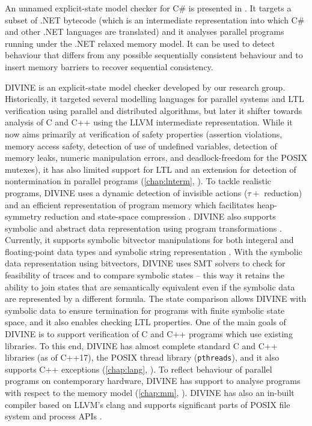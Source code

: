 An unnamed explicit-state model checker for C\# is presented in .
It targets a subset of .NET bytecode (which is an intermediate representation into which C\# and other .NET languages are translated) and it analyses parallel programs running under the .NET relaxed memory model.
It can be used to detect behaviour that differs from any possible sequentially consistent behaviour and to insert memory barriers to recover sequential consistency.

DIVINE  is an explicit-state model checker developed
by our research group.
Historically, it targeted several modelling languages for parallel systems and
LTL verification using parallel and distributed algorithms, but later it
shifter towards analysis of C and C++ using the LLVM intermediate representation.
While it now aims primarily at verification of safety properties (assertion
violations, memory access safety, detection of use of undefined variables,
detection of memory leaks, numeric manipulation errors, and deadlock-freedom for
the POSIX mutexes), it has also limited support for LTL and an
extension for detection of nontermination in parallel programs
(\autoref{chap:lnterm}, ).
To tackle realistic programs, DIVINE uses a dynamic detection of invisible
actions ($\tau+$ reduction) and an efficient representation of program memory
which facilitates heap-symmetry reduction and state-space
compression .
DIVINE also supports symbolic and abstract data representation using program
transformations .
Currently, it supports symbolic bitvector manipulations for both integeral and floating-point data types and symbolic string representation .
With the symbolic data representation using bitvectors, DIVINE uses SMT solvers
to check for feasibility of traces and to compare symbolic states -- this way
it retains the ability to join states that are semantically equivalent even if
the symbolic data are represented by a different formula.
The state comparison allows DIVINE with symbolic data to ensure termination for
programs with finite symbolic state space, and it also enables checking LTL
properties.
One of the main goals of DIVINE is to support verification of C and C++
programs which use existing libraries.
To this end, DIVINE has almost complete standard C and C++ libraries (as of
C++17), the POSIX thread library (\texttt{pthreads}), and it also supports C++
exceptions (\autoref{chap:lang}, ).
To reflect behaviour of parallel programs on contemporary hardware, DIVINE
has support to analyse programs with respect to the \xtso memory
model (\autoref{chap:mm}, ).
DIVINE has also an in-built compiler based on LLVM's clang and supports
significant parts of POSIX file system and process APIs .


